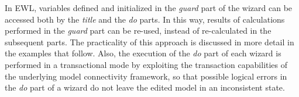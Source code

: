 In EWL, variables defined and initialized in the \emph{guard} part of the wizard can be accessed both by the \emph{title} and the \emph{do} parts. In this way, results of calculations performed in the \emph{guard} part can be re-used, instead of re-calculated in the subsequent parts.  The practicality of this approach is discussed in more detail in the examples that follow. Also, the execution of the \emph{do} part of each wizard is performed in a transactional mode by exploiting the transaction capabilities of the underlying model connectivity framework, so that possible logical errors in the \emph{do} part of a wizard do not leave the edited model in an inconsistent state. 
